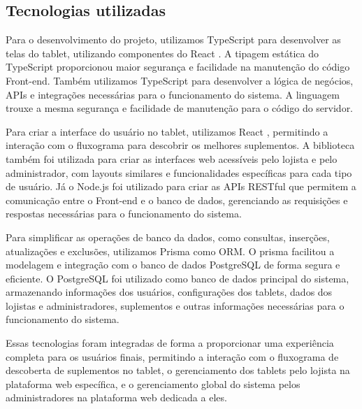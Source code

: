 \hypertarget{__RefHeading___Toc4741_3118176633}{}
\subsection{Tecnologias utilizadas}
\label{ages-i:text-h-0012}

Para o desenvolvimento do projeto, utilizamos TypeScript \cite{typescript-docs} para desenvolver as telas do tablet, utilizando componentes do React \cite{react-docs}. A tipagem estática do TypeScript proporcionou maior segurança e facilidade na manutenção do código Front-end.
Também utilizamos TypeScript para desenvolver a lógica de negócios, APIs e integrações necessárias para o funcionamento do sistema. A linguagem trouxe a mesma segurança e facilidade de manutenção para o código do servidor.

Para criar a interface do usuário no tablet, utilizamos React \cite{react-docs}, permitindo a interação com o fluxograma para descobrir os melhores suplementos.
A biblioteca também foi utilizada para criar as interfaces web acessíveis pelo lojista e pelo administrador, com layouts similares e funcionalidades específicas para cada tipo de usuário.
Já o Node.js \cite{nodejs-docs} foi utilizado para criar as APIs RESTful que permitem a comunicação entre o Front-end e o banco de dados, gerenciando as requisições e respostas necessárias para o funcionamento do sistema.

Para simplificar as operações de banco da dados, como consultas, inserções, atualizações e exclusões, utilizamos Prisma \cite{prisma-docs} como ORM. O prisma facilitou a modelagem e integração com o banco de dados PostgreSQL \cite{postgresql-docs} de forma segura e eficiente.
O PostgreSQL foi utilizado como banco de dados principal do sistema, armazenando informações dos usuários, configurações dos tablets, dados dos lojistas e administradores, suplementos e outras informações necessárias para o funcionamento do sistema.

Essas tecnologias foram integradas de forma a proporcionar uma experiência completa para os usuários finais, permitindo a interação com o fluxograma de descoberta de suplementos no tablet, o gerenciamento dos tablets pelo lojista na plataforma web específica, e o gerenciamento global do sistema pelos administradores na plataforma web dedicada a eles.\par
